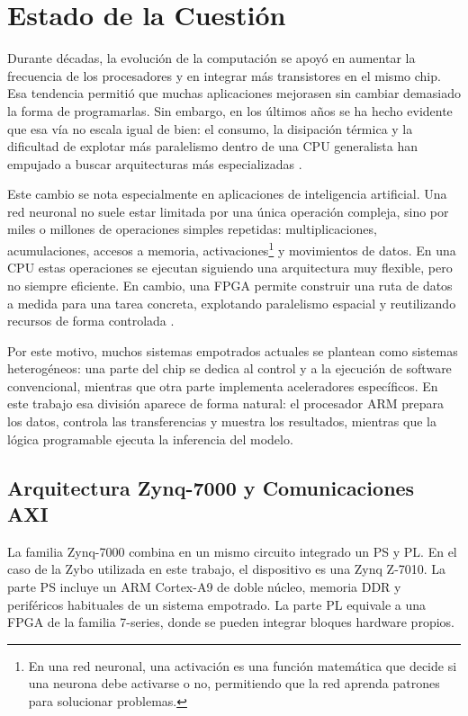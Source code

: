 \chapter{Estado de la Cuestión}
\label{cap:estadoDeLaCuestion}

Durante décadas, la evolución de la computación se apoyó en aumentar la frecuencia de los
procesadores y en integrar más transistores en el mismo chip. Esa tendencia permitió que muchas
aplicaciones mejorasen sin cambiar demasiado la forma de programarlas. Sin embargo, en los últimos
años se ha hecho evidente que esa vía no escala igual de bien: el consumo, la disipación térmica y
la dificultad de explotar más paralelismo dentro de una \ac{CPU} generalista han empujado a buscar
arquitecturas más especializadas \citep{10.1145/3282307}.

Este cambio se nota especialmente en aplicaciones de inteligencia artificial. Una red neuronal no
suele estar limitada por una única operación compleja, sino por miles o millones de operaciones
simples repetidas: multiplicaciones, acumulaciones, accesos a memoria,
activaciones\footnote{En una red neuronal, una activación es una función matemática que
  decide si una neurona debe activarse o no, permitiendo que la red aprenda patrones para
solucionar problemas.} y movimientos
de datos. En una \ac{CPU} estas operaciones se ejecutan siguiendo una arquitectura muy
flexible, pero no
siempre eficiente. En cambio, una \ac{FPGA} permite construir una ruta de datos a medida
para una tarea
concreta, explotando paralelismo espacial y reutilizando recursos de forma controlada
\citep{electronics10091025}.

Por este motivo, muchos sistemas empotrados actuales se plantean como sistemas heterogéneos: una
parte del chip se dedica al control y a la ejecución de software convencional, mientras que otra
parte implementa aceleradores específicos. En este trabajo esa división aparece de forma natural:
el procesador \ac{ARM} prepara los datos, controla las transferencias y muestra los
resultados, mientras
que la lógica programable ejecuta la inferencia del modelo.

\section{Arquitectura Zynq-7000 y Comunicaciones AXI}
La familia Zynq-7000 combina en un mismo circuito integrado un
\ac{PS} y \ac{PL}. En el caso
de la Zybo utilizada en este trabajo, el dispositivo es una Zynq Z-7010. La parte \ac{PS}
incluye un \ac{ARM}
Cortex-A9 de doble núcleo, memoria \ac{DDR} y periféricos habituales de un sistema
empotrado. La parte
\ac{PL} equivale a una \ac{FPGA} de la familia 7-series, donde se pueden integrar bloques
hardware propios.

